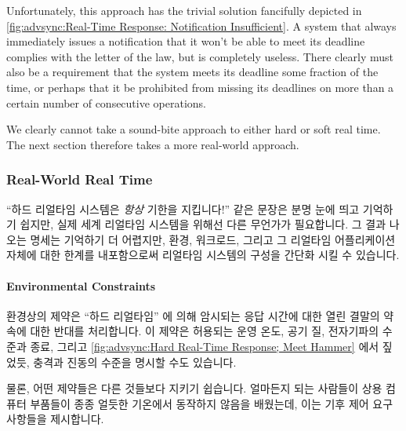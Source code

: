 Unfortunately, this approach has the trivial solution fancifully depicted in
\cref{fig:advsync:Real-Time Response: Notification Insufficient}.
A system that always immediately issues a notification that it won't
be able to meet its deadline complies with the letter of the law,
but is completely useless.
There clearly must also be a requirement that the system meets its deadline
some fraction of the time, or perhaps that it be prohibited from missing
its deadlines on more than a certain number of consecutive operations.

We clearly cannot take a sound-bite approach to either hard or soft
real time.
The next section therefore takes a more real-world approach.

\fi

\subsubsection{Real-World Real Time}
\label{sec:advsync:Real-World Real Time}

``하드 리얼타임 시스템은 \emph{항상} 기한을 지킵니다!'' 같은 문장은 분명 눈에
띄고 기억하기 쉽지만, 실제 세계 리얼타임 시스템을 위해선 다른 무언가가
필요합니다.
그 결과 나오는 명세는 기억하기 더 어렵지만, 환경, 워크로드, 그리고 그 리얼타임
어플리케이션 자체에 대한 한계를 내포함으로써 리얼타임 시스템의 구성을 간단화
시킬 수 있습니다.

\paragraph{Environmental Constraints}
\label{sec:advsync:Environmental Constraints}

환경상의 제약은 ``하드 리얼타임'' 에 의해 암시되는 응답 시간에 대한 열린 결말의
약속에 대한 반대를 처리합니다.
이 제약은 허용되는 운영 온도, 공기 질, 전자기파의 수준과 종료, 그리고
\cref{fig:advsync:Hard Real-Time Response; Meet Hammer} 에서 짚었듯, 충격과
진동의 수준을 명시할 수도 있습니다.

물론, 어떤 제약들은 다른 것들보다 지키기 쉽습니다.
얼마든지 되는 사람들이 상용 컴퓨터 부품들이 종종 얼듯한 기온에서 동작하지
않음을 배웠는데, 이는 기후 제어 요구사항들을 제시합니다.

